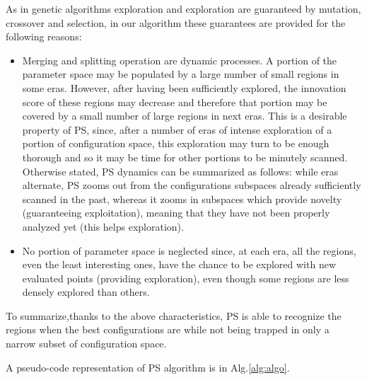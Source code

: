 As in genetic algorithms exploration and exploration are guaranteed by mutation, crossover and selection, in our algorithm these guarantees are provided for the following reasons:
	\begin{itemize}
		\item Merging and splitting operation are dynamic processes. A portion
of the parameter space may be populated by a large number of small
regions in some eras. However, after having been sufficiently explored, the innovation score of these regions may decrease and therefore that portion may be covered by a small number of large regions in next eras. This is a desirable property of PS, since, after a number of eras of intense exploration of a portion of configuration space, this exploration may turn to be enough thorough and so it may be time for other portions to be minutely scanned. Otherwise stated, PS dynamics can be summarized as follows: while eras alternate, PS zooms out from the configurations subspaces already sufficiently scanned in the past, whereas it zooms in subspaces which provide novelty (guaranteeing exploitation), meaning that they have not been properly analyzed yet (this helps exploration). 
		\item No portion of parameter space is neglected since, at each era, all the regions, even the least interesting ones, have the chance to be explored with new evaluated points (providing exploration), even though some regions are less densely explored than others.
	\end{itemize}

To summarize,thanks to the above characteristics, PS is able to recognize the regions when the best configurations are while not being trapped in only a narrow subset of configuration space.

A pseudo-code representation of PS algorithm is in Alg.\ref{alg:algo}.

